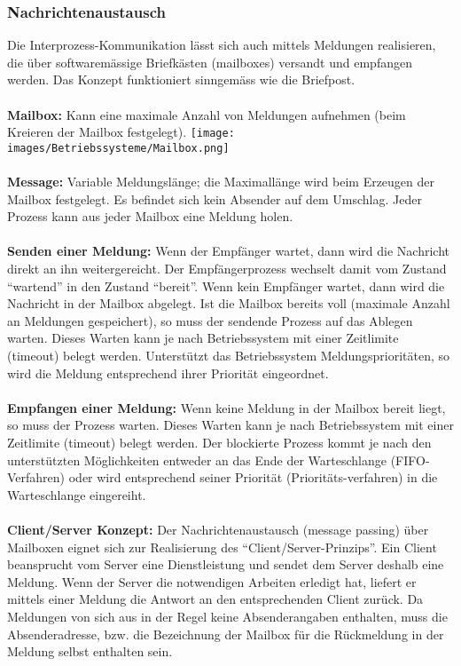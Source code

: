 \subsubsection{Nachrichtenaustausch}
Die Interprozess-Kommunikation lässt sich auch mittels Meldungen realisieren, die über softwaremässige Briefkästen (mailboxes) versandt und empfangen werden. Das Konzept funktioniert sinngemäss wie die Briefpost.\\\\
\textbf{Mailbox:} Kann eine maximale Anzahl von Meldungen aufnehmen (beim Kreieren
der Mailbox festgelegt).
\texttt{[image: images/Betriebssysteme/Mailbox.png]}\\\\
\textbf{Message:} Variable Meldungslänge; die Maximallänge wird beim Erzeugen der Mailbox
festgelegt. Es befindet sich kein Absender auf dem Umschlag. Jeder Prozess kann aus jeder Mailbox eine Meldung holen.\\\\
\textbf{Senden einer Meldung:}
Wenn der Empfänger wartet, dann wird die Nachricht direkt an ihn weitergereicht. Der Empfängerprozess wechselt damit vom Zustand "`wartend"' in den Zustand "`bereit"'. Wenn kein Empfänger wartet, dann wird die Nachricht in der Mailbox abgelegt. Ist die Mailbox bereits voll (maximale Anzahl an Meldungen gespeichert),
so muss der sendende Prozess auf das Ablegen warten. Dieses Warten kann je nach Betriebssystem mit einer Zeitlimite (timeout) belegt werden. Unterstützt das Betriebssystem Meldungsprioritäten, so wird die Meldung
entsprechend ihrer Priorität eingeordnet.\\\\
\textbf{Empfangen einer Meldung:} Wenn keine Meldung in der Mailbox bereit liegt, so muss der Prozess warten. Dieses Warten kann je nach Betriebssystem mit einer Zeitlimite (timeout) belegt werden. Der blockierte Prozess kommt je nach den unterstützten Möglichkeiten entweder an das Ende der Warteschlange (FIFO-Verfahren) oder wird entsprechend seiner Priorität (Prioritäts-verfahren) in die Warteschlange eingereiht.\\\\
\textbf{Client/Server Konzept:} 
Der Nachrichtenaustausch (message passing) über Mailboxen eignet sich zur Realisierung des "`Client/Server-Prinzips"'. Ein Client beansprucht vom Server eine Dienstleistung und sendet dem Server deshalb eine Meldung. Wenn der Server die notwendigen Arbeiten erledigt hat, liefert er mittels einer Meldung die Antwort an den entsprechenden Client zurück. Da Meldungen von sich aus in der Regel keine Absenderangaben enthalten, muss die Absenderadresse, bzw. die Bezeichnung der Mailbox für die Rückmeldung in der Meldung selbst enthalten sein.\\\\

